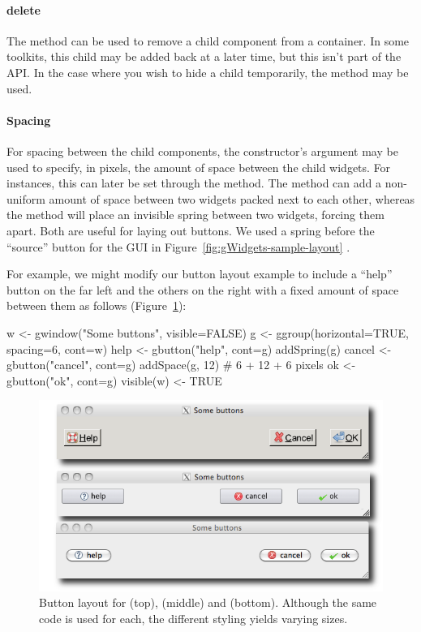 \paragraph{delete}
The  method can be used to remove a child
component from a container. In some toolkits, this child may be
added back at a later time, but this isn't part of the API. In the
case where you wish to hide a child temporarily, the
 method may be used.





\paragraph{Spacing}
For spacing between the child components, the constructor's argument
 may be used to specify, in pixels, the
amount of space between the child widgets. For 
instances, this can later be set through the 
method. The method  can add a non-uniform
amount of space between two widgets packed next to each other, whereas
the method  will place an invisible spring
between two widgets, forcing them apart.  Both are useful for laying
out buttons. We used a spring before the ``source'' button for the GUI
in Figure~\ref{fig:gWidgets-sample-layout} .


For example, we might modify our button layout example to include a
``help'' button on the far left and the others on the right with a
fixed amount of space between them as follows (Figure~\ref{fig:gWidgets-button-layout}):
\begin{Schunk}
\begin{Sinput}
 w <- gwindow("Some buttons", visible=FALSE)
 g <- ggroup(horizontal=TRUE, spacing=6, cont=w)
 help <- gbutton("help", cont=g)
 addSpring(g)
 cancel <- gbutton("cancel", cont=g)
 addSpace(g, 12)                         # 6 + 12 + 6 pixels
 ok <- gbutton("ok", cont=g)
 visible(w) <- TRUE
\end{Sinput}
\end{Schunk}


\begin{figure}
  \centering
  \includegraphics[width=.7\textwidth]{fig-gWidgets-buttons}
  \caption{Button layout for  (top),  (middle)
    and  (bottom). Although the same code is used for each, the different styling yields varying sizes. }
  \label{fig:gWidgets-button-layout}
\end{figure}

